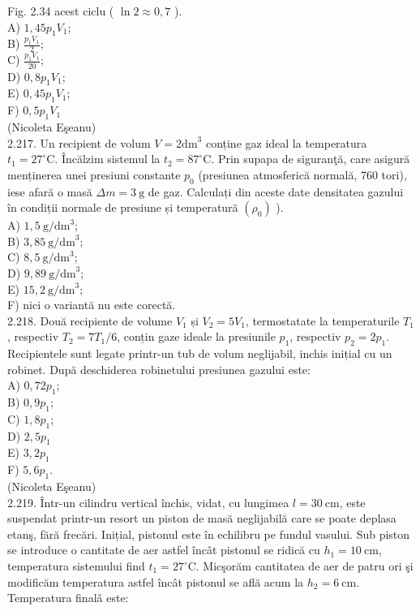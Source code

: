 \documentclass[10pt]{article}
\begin{document}
Fig. 2.34 acest ciclu ( $\ln 2 \approx 0,7$ ).\\
A) $1,45 p_{1} V_{1}$;\\
B) $\frac{p_{1} V_{1}}{2}$;\\
C) $\frac{p_{1} V_{1}}{20}$;\\
D) $0,8 p_{1} V_{1}$;\\
E) $0,45 p_{1} V_{1}$;\\
F) $0,5 p_{1} V_{1}$\\
(Nicoleta Eşeanu)\\
2.217. Un recipient de volum $V=2 \mathrm{dm}^{3}$ conține gaz ideal la temperatura $t_{1}=27^{\circ} \mathrm{C}$. Încălzim sistemul la $t_{2}=87^{\circ} \mathrm{C}$. Prin supapa de siguranţă, care asigură menținerea unei presiuni constante $p_{0}$ (presiunea atmosferică normală, 760 tori), iese afară o masă $\Delta m=3 \mathrm{~g}$ de gaz. Calculați din aceste date densitatea gazului în condiții normale de presiune și temperatură $\left(\rho_{0}\right)$ ).\\
A) $1,5 \mathrm{~g} / \mathrm{dm}^{3}$;\\
B) $3,85 \mathrm{~g} / \mathrm{dm}^{3}$;\\
C) $8,5 \mathrm{~g} / \mathrm{dm}^{3}$;\\
D) $9,89 \mathrm{~g} / \mathrm{dm}^{3}$;\\
E) $15,2 \mathrm{~g} / \mathrm{dm}^{3}$;\\
F) nici o variantă nu este corectă.\\
2.218. Două recipiente de volume $V_{1}$ și $V_{2}=5 V_{1}$, termostatate la temperaturile $T_{1}$, respectiv $T_{2}=7 T_{1} / 6$, conțin gaze ideale la presiunile $p_{1}$, respectiv $p_{2}=2 p_{1}$. Recipientele sunt legate printr-un tub de volum neglijabil, inchis inițial cu un robinet. După deschiderea robinetului presiunea gazului este:\\
A) $0,72 p_{1}$;\\
B) $0,9 p_{1}$;\\
C) $1,8 p_{1}$;\\
D) $2,5 p_{1}$\\
E) $3,2 p_{1}$\\
F) $5,6 p_{1}$.\\
(Nicoleta Eşeanu)\\
2.219. Într-un cilindru vertical închis, vidat, cu lungimea $l=30 \mathrm{~cm}$, este suspendat printr-un resort un piston de masă neglijabilă care se poate deplasa etanş, fără frecări. Inițial, pistonul este în echilibru pe fundul vasului. Sub piston se introduce o cantitate de aer astfel încât pistonul se ridică cu $h_{1}=10 \mathrm{~cm}$, temperatura sistemului find $t_{1}=27^{\circ} \mathrm{C}$. Micşorăm cantitatea de aer de patru ori şi modificăm temperatura astfel încât pistonul se află acum la $h_{2}=6 \mathrm{~cm}$. Temperatura finalǎ este:\\
\end{document}
